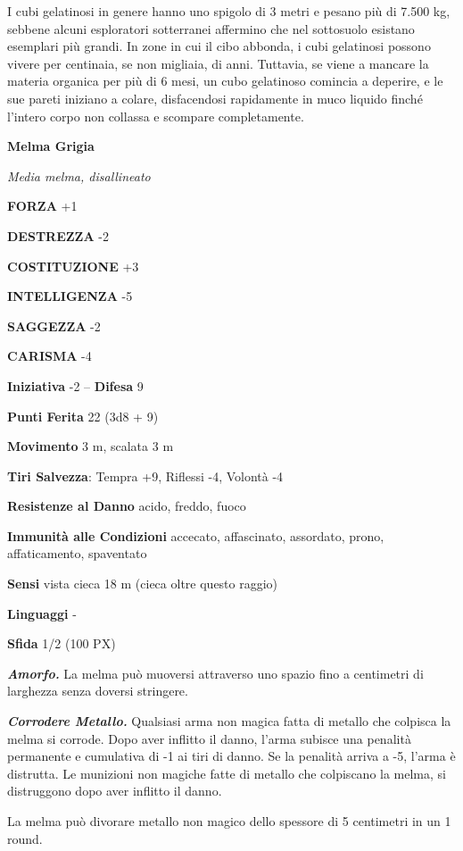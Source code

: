 \begin{multicols}{2}
	I cubi gelatinosi in genere hanno uno spigolo di 3 metri e pesano più di 7.500 kg, sebbene alcuni esploratori sotterranei affermino che nel sottosuolo esistano esemplari più grandi. In zone in cui il cibo abbonda, i cubi gelatinosi possono vivere per centinaia, se non migliaia, di anni. Tuttavia, se viene a mancare la materia organica per più di 6 mesi, un cubo gelatinoso comincia a deperire, e le sue pareti iniziano a colare, disfacendosi rapidamente in muco liquido finché l'intero corpo non collassa e scompare completamente.


	\medskip{}\textbf{Melma Grigia}

	\textit{Media melma, disallineato}

	\textbf{FORZA} +1

	\textbf{DESTREZZA} -2

	\textbf{COSTITUZIONE} +3

	\textbf{INTELLIGENZA} -5

	\textbf{SAGGEZZA} -2

	\textbf{CARISMA} -4

	\textbf{Iniziativa} -2 -- \textbf{Difesa} 9

	\textbf{Punti Ferita} 22 (3d8 + 9)

	\textbf{Movimento} 3 m, scalata 3 m

	\textbf{Tiri Salvezza}: Tempra +9, Riflessi -4, Volontà -4

	\textbf{Resistenze al Danno} acido, freddo, fuoco

	\textbf{Immunità alle Condizioni} accecato, affascinato, assordato, prono, affaticamento, spaventato

	\textbf{Sensi} vista cieca 18 m (cieca oltre questo raggio)

	\textbf{Linguaggi} -

	\textbf{Sfida} 1/2 (100 PX)

	\textit{\textbf{Amorfo.}} La melma può muoversi attraverso uno spazio fino a centimetri di larghezza senza doversi stringere.

	\textit{\textbf{Corrodere Metallo.}} Qualsiasi arma non magica fatta di metallo che colpisca la melma si corrode. Dopo aver inflitto il danno, l'arma subisce una penalità permanente e cumulativa di -1 ai tiri di danno. Se la penalità arriva a -5, l'arma è distrutta. Le munizioni non magiche fatte di metallo che colpiscano la melma, si distruggono dopo aver inflitto il danno.

	La melma può divorare metallo non magico dello spessore di 5 centimetri in un 1 round.


\end{multicols}
